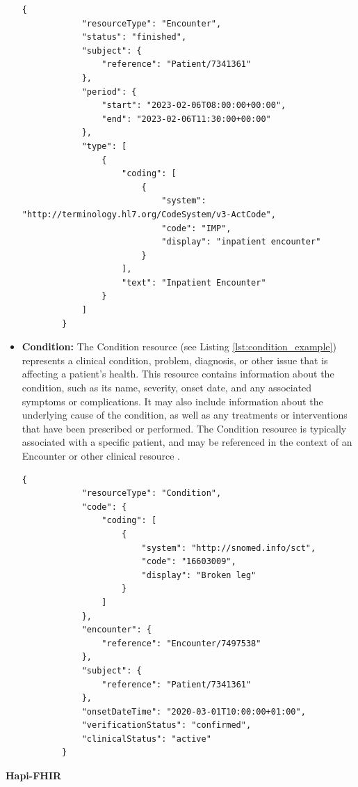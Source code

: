 \documentclass[]{report}
\begin{document}
\begin{itemize}
\begin{lstlisting}[style=json, label=lst:encounter_example, caption={Example for a FHIR encounter ressource}]
        {
            "resourceType": "Encounter",
            "status": "finished",
            "subject": {
                "reference": "Patient/7341361"
            },
            "period": {
                "start": "2023-02-06T08:00:00+00:00",
                "end": "2023-02-06T11:30:00+00:00"
            },
            "type": [
                {
                    "coding": [
                        {
                            "system": "http://terminology.hl7.org/CodeSystem/v3-ActCode",
                            "code": "IMP",
                            "display": "inpatient encounter"
                        }
                    ],
                    "text": "Inpatient Encounter"
                }
            ]
        }
    \end{lstlisting}
    \item \textbf{Condition:} The Condition resource (see Listing \ref{lst:condition_example}) represents a clinical condition, problem, diagnosis, or other issue that is affecting a patient's health. This resource contains information about the condition, such as its name, severity, onset date, and any associated symptoms or complications. It may also include information about the underlying cause of the condition, as well as any treatments or interventions that have been prescribed or performed. The Condition resource is typically associated with a specific patient, and may be referenced in the context of an Encounter or other clinical resource \cite{hl7-fhir}.\begin{lstlisting}[style=json, label=lst:condition_example, caption={Example for a FHIR condition ressource}]
        {
            "resourceType": "Condition",
            "code": {
                "coding": [
                    {
                        "system": "http://snomed.info/sct",
                        "code": "16603009",
                        "display": "Broken leg"
                    }
                ]
            },
            "encounter": {
                "reference": "Encounter/7497538"
            },
            "subject": {
                "reference": "Patient/7341361"
            },
            "onsetDateTime": "2020-03-01T10:00:00+01:00",
            "verificationStatus": "confirmed",
            "clinicalStatus": "active"
        }    
    \end{lstlisting}
\end{itemize}
\textbf{Hapi-FHIR}\\
\end{document}

